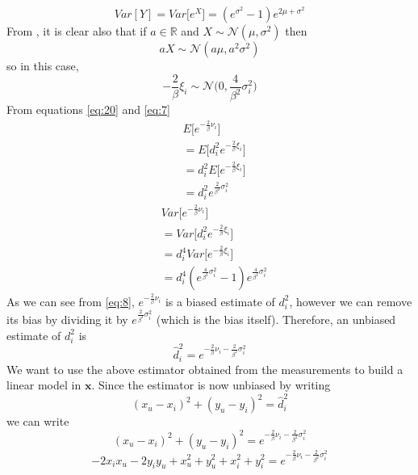 \documentclass[12pt]{report}
\begin{document}
\begin{equation}
    Var[Y]=Var\big[e^X\big]=(e^{\sigma^2}-1)e^{2\mu+\sigma^2}
    \label{eq:7}
\end{equation}
From \cite{alma9926534668905776}, it is clear also that if $a\in \mathbb{R}$ and $X\sim \mathcal{N}(\mu,\sigma^2)$ then
\begin{equation}
aX\sim \mathcal{N}(a\mu,a^2\sigma^2)    
\end{equation}
so in this case, 
\begin{equation}
    -\frac{2}{\beta}\xi_i\sim \mathcal{N}\bigg(0,\frac{4}{\beta^2}\sigma^2_i\bigg)
\end{equation}
From equations \ref{eq:20} and \ref{eq:7}
\begin{align}
    &E\bigg[e^{-\frac{2}{\beta}\nu_i}\bigg]\\
    &=E\bigg[d_i^2e^{-\frac{2}{\beta}\xi_i}\bigg]\\
    &=d_i^2E\bigg[e^{-\frac{2}{\beta}\xi_i}\bigg]\\ &=d_i^2e^{\frac{2}{\beta^2}\sigma^2_i}
    \label{eq:8}
\end{align}
\begin{align}
    &Var\bigg[e^{-\frac{2}{\beta}\nu_i}\bigg]\\
    &=Var\bigg[d_i^2e^{-\frac{2}{\beta}\xi_i}\bigg]\\
    &=d_i^4Var\bigg[e^{-\frac{2}{\beta}\xi_i}\bigg]\\
    &=d_i^4(e^{\frac{4}{\beta^2}\sigma_i^2}-1)e^{\frac{4}{\beta^2}\sigma^2_i}
    \label{eq:21}
\end{align}
As we can see from \ref{eq:8}, $e^{-\frac{2}{\beta}\nu_i}$ is a biased estimate of $d_i^2$, however we can remove its bias by dividing it by $e^{\frac{2}{\beta^2}\sigma^2_i}$ (which is the bias itself). Therefore, an unbiased estimate of $d_i^2$ is 
\begin{equation}
    \hat{d}_i^2=e^{-\frac{2}{\beta}\nu_i-\frac{2}{\beta^2}\sigma^2_i}
    \label{eq:9}
\end{equation}
We want to use the above estimator obtained from the measurements to build a linear model in $\mathbf{x}$. Since the estimator is now unbiased by writing 
\begin{equation}
    (x_u-x_i)^2+(y_u-y_i)^2=\hat{d}_i^2
\end{equation}
we can write
\begin{equation}
    (x_u-x_i)^2+(y_u-y_i)^2=e^{-\frac{2}{\beta}\nu_i-\frac{2}{\beta^2}\sigma^2_i}
\end{equation}
\begin{equation}
    -2x_ix_u-2y_iy_u+x^2_u+y^2_u+x_i^2+y_i^2=e^{-\frac{2}{\beta}\nu_i-\frac{2}{\beta^2}\sigma^2_i}
\end{equation}
\end{document}
